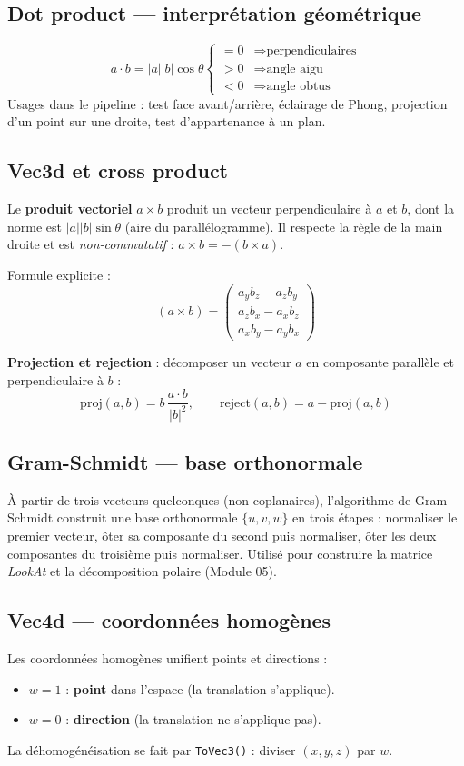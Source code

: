 \documentclass[11pt,a4paper]{article}
\begin{document}
\subsection{Dot product — interprétation géométrique}
\[
  a \cdot b = |a||b|\cos\theta
  \begin{cases}
    = 0  & \Rightarrow \text{perpendiculaires} \\
    > 0  & \Rightarrow \text{angle aigu} \\
    < 0  & \Rightarrow \text{angle obtus}
  \end{cases}
\]
Usages dans le pipeline : test face avant/arrière, éclairage de Phong, projection d'un point sur
une droite, test d'appartenance à un plan.

\subsection{Vec3d et cross product}
Le \textbf{produit vectoriel} $a \times b$ produit un vecteur perpendiculaire à $a$ et $b$, dont la
norme est $|a||b|\sin\theta$ (aire du parallélogramme). Il respecte la règle de la main droite et
est \textit{non-commutatif} : $a \times b = -(b \times a)$.

Formule explicite :
\[
  (a \times b) = \begin{pmatrix} a_y b_z - a_z b_y \\ a_z b_x - a_x b_z \\ a_x b_y - a_y b_x \end{pmatrix}
\]

\textbf{Projection et rejection} : décomposer un vecteur $a$ en composante parallèle et
perpendiculaire à $b$ :
\[
  \text{proj}(a,b) = b \,\frac{a \cdot b}{|b|^2}, \qquad \text{reject}(a,b) = a - \text{proj}(a,b)
\]

\subsection{Gram-Schmidt — base orthonormale}
À partir de trois vecteurs quelconques (non coplanaires), l'algorithme de Gram-Schmidt construit
une base orthonormale $\{u, v, w\}$ en trois étapes : normaliser le premier vecteur, ôter sa
composante du second puis normaliser, ôter les deux composantes du troisième puis normaliser.
Utilisé pour construire la matrice \textit{LookAt} et la décomposition polaire (Module 05).

\subsection{Vec4d — coordonnées homogènes}
Les coordonnées homogènes unifient points et directions :
\begin{itemize}[noitemsep]
  \item $w = 1$ : \textbf{point} dans l'espace (la translation s'applique).
  \item $w = 0$ : \textbf{direction} (la translation ne s'applique pas).
\end{itemize}
La déhomogénéisation se fait par \texttt{ToVec3()} : diviser $(x, y, z)$ par $w$.
\end{document}
